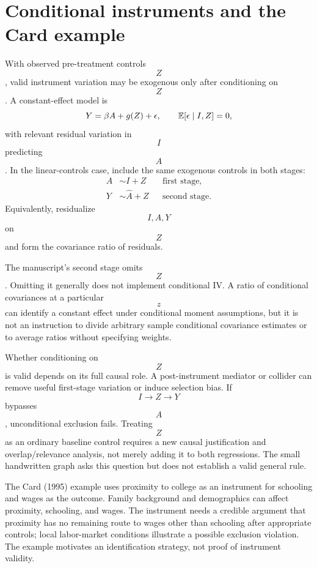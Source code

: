 \section{Conditional instruments and the Card example}
With observed pre-treatment controls $$Z$$, valid instrument variation may be exogenous only after conditioning on $$Z$$. A constant-effect model is
\begin{equation}
Y=\beta A+g(Z)+\epsilon,\qquad \mathbb E[\epsilon\mid I,Z]=0,
\end{equation}
with relevant residual variation in $$I$$ predicting $$A$$. In the linear-controls case, include the same exogenous controls in both stages:
\begin{align}
A&\sim I+Z &&\text{first stage},\\
Y&\sim\widehat A+Z &&\text{second stage}.
\end{align}
Equivalently, residualize $$I,A,Y$$ on $$Z$$ and form the covariance ratio of residuals.
\begin{correction}
The manuscript's second stage omits $$Z$$. Omitting it generally does not implement conditional IV. A ratio of conditional covariances at a particular $$z$$ can identify a constant effect under conditional moment assumptions, but it is not an instruction to divide arbitrary sample conditional covariance estimates or to average ratios without specifying weights.
\end{correction}
\begin{remarkbox}
Whether conditioning on $$Z$$ is valid depends on its full causal role. A post-instrument mediator or collider can remove useful first-stage variation or induce selection bias. If $$I\to Z\to Y$$ bypasses $$A$$, unconditional exclusion fails. Treating $$Z$$ as an ordinary baseline control requires a new causal justification and overlap/relevance analysis, not merely adding it to both regressions. The small handwritten graph asks this question but does not establish a valid general rule.
\end{remarkbox}

The Card (1995) example uses proximity to college as an instrument for schooling and wages as the outcome. Family background and demographics can affect proximity, schooling, and wages. The instrument needs a credible argument that proximity has no remaining route to wages other than schooling after appropriate controls; local labor-market conditions illustrate a possible exclusion violation. The example motivates an identification strategy, not proof of instrument validity.

